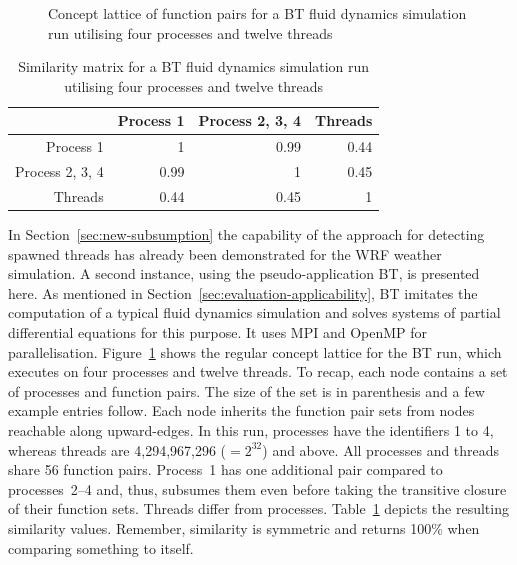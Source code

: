 \documentclass[a4paper, final, diplominf]{zih-template}
\begin{document}
\begin{figure}[h]
	\centering
	
	\caption{Concept lattice of function pairs for a BT fluid dynamics simulation run utilising four processes and twelve threads}
	\label{fig:bt-16p-concept-lattice}
\end{figure}
\begin{table}[b]
	\centering
	\caption{Similarity matrix for a BT fluid dynamics simulation run utilising four processes and twelve threads}
	\vspace{0.2cm}
	\begin{tabular}{r | r r r}
						& Process 1 & Process 2, 3, 4 & Threads \\
		\hline
		Process 1       &    1      & 0.99            & 0.44    \\
		Process 2, 3, 4 & 0.99      &    1            & 0.45    \\
		Threads         & 0.44      & 0.45            &    1    \\
	\end{tabular}
	\label{tab:bt-similarity-matrix}
\end{table}
In Section~\ref{sec:new-subsumption} the capability of the approach for detecting spawned threads has already been demonstrated for the WRF weather simulation.
A second instance, using the pseudo-application BT, is presented here.
As mentioned in Section~\ref{sec:evaluation-applicability}, BT imitates the computation of a typical fluid dynamics simulation and solves systems of partial differential equations for this purpose.
It uses MPI and OpenMP for parallelisation.
Figure~\ref{fig:bt-16p-concept-lattice} shows the regular concept lattice for the BT run, which executes on four processes and twelve threads.
To recap, each node contains a set of processes and function pairs.
The size of the set is in parenthesis and a few example entries follow.
Each node inherits the function pair sets from nodes reachable along upward-edges.
In this run, processes have the identifiers 1 to 4, whereas threads are 4,294,967,296 ($= 2^{32}$) and above.
All processes and threads share 56 function pairs.
Process~1 has one additional pair compared to processes~2--4 and, thus, subsumes them even before taking the transitive closure of their function sets.
Threads differ from processes.
Table~\ref{tab:bt-similarity-matrix} depicts the resulting similarity values.
Remember, similarity is symmetric and returns 100\% when comparing something to itself.
\end{document}
